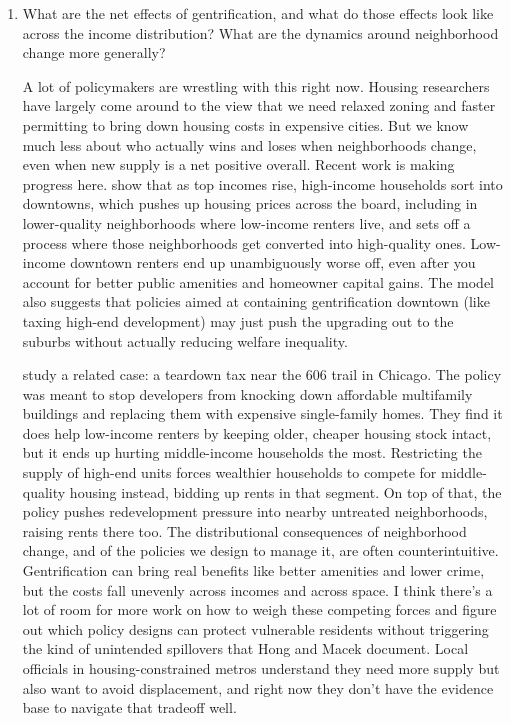 \documentclass{article}
\begin{document}
\begin{enumerate}
    \item What are the net effects of gentrification, and what do those effects look like across the income distribution? What are the dynamics around neighborhood change more generally? 
    
    A lot of policymakers are wrestling with this right now. Housing researchers have largely come around to the view that we need relaxed zoning and faster permitting to bring down housing costs in expensive cities. But we know much less about who actually wins and loses when neighborhoods change, even when new supply is a net positive overall.
    Recent work is making progress here. \cite{couture_income_2024} show that as top incomes rise, high-income households sort into downtowns, which pushes up housing prices across the board, including in lower-quality neighborhoods where low-income renters live, and sets off a process where those neighborhoods get converted into high-quality ones. 
    Low-income downtown renters end up unambiguously worse off, even after you account for better public amenities and homeowner capital gains. 
    The model also suggests that policies aimed at containing gentrification downtown (like taxing high-end development) may just push the upgrading out to the suburbs without actually reducing welfare inequality.
    
    \cite{hong_redevelopment_2025} study a related case: a teardown tax near the 606 trail in Chicago. The policy was meant to stop developers from knocking down affordable multifamily buildings and replacing them with expensive single-family homes. They find it does help low-income renters by keeping older, cheaper housing stock intact, but it ends up hurting middle-income households the most. Restricting the supply of high-end units forces wealthier households to compete for middle-quality housing instead, bidding up rents in that segment. On top of that, the policy pushes redevelopment pressure into nearby untreated neighborhoods, raising rents there too.
    The distributional consequences of neighborhood change, and of the policies we design to manage it, are often counterintuitive. Gentrification can bring real benefits like better amenities and lower crime, but the costs fall unevenly across incomes and across space. I think there's a lot of room for more work on how to weigh these competing forces and figure out which policy designs can protect vulnerable residents without triggering the kind of unintended spillovers that Hong and Macek document. Local officials in housing-constrained metros understand they need more supply but also want to avoid displacement, and right now they don't have the evidence base to navigate that tradeoff well.


\end{enumerate}
\end{document}
